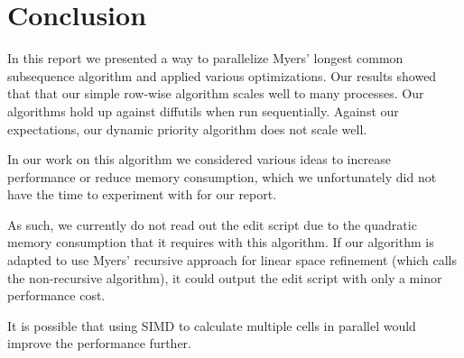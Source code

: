 \section{Conclusion}
In this report we presented a way to parallelize Myers' longest common subsequence algorithm and applied various optimizations. Our results showed that that our simple row-wise algorithm scales well to many processes. Our algorithms hold up against diffutils when run sequentially. Against our expectations, our dynamic priority algorithm does not scale well.

In our work on this algorithm we considered various ideas to increase performance or reduce memory consumption, which we unfortunately did not have the time to experiment with for our report.

As such, we currently do not read out the edit script due to the quadratic memory consumption that it requires with this algorithm. If our algorithm is adapted to use Myers' recursive approach for linear space refinement \cite{myers_anond_1986} (which calls the non-recursive algorithm), it could output the edit script with only a minor performance cost.

It is possible that using SIMD to calculate multiple cells in parallel would improve the performance further.
    
